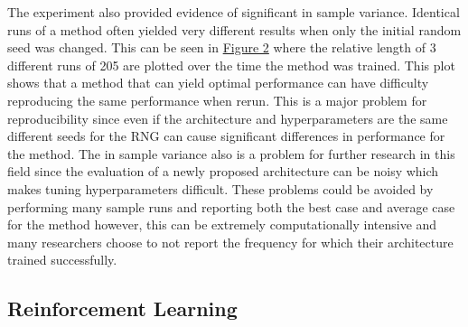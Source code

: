 \documentclass[12pt]{article}
\begin{document}
The experiment also provided evidence of significant in sample variance. Identical runs of a method often yielded very different results when only the initial random seed was changed. This can be seen in  \hyperref[samp_var]{Figure 2} where the relative length of 3 different runs of 205 are plotted over the time the method was trained. This plot shows that a method that can yield optimal performance can have difficulty reproducing the same performance when rerun. This is a major problem for reproducibility since even if the architecture and hyperparameters are the same different seeds for the RNG can cause significant differences in performance for the method. The in sample variance also is a problem for further research in this field since the evaluation of a newly proposed architecture can be noisy which makes tuning hyperparameters difficult. These problems could be avoided by performing many sample runs and reporting both the best case and average case for the method however, this can be extremely computationally intensive and many researchers choose to not report the frequency for which their architecture trained successfully.


\subsection{Reinforcement Learning}




\end{document}

